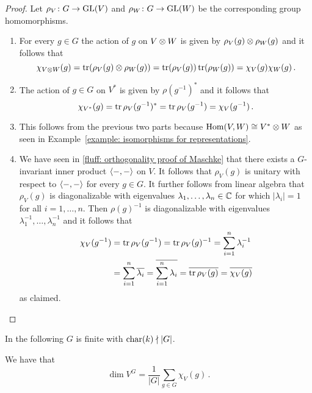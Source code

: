 \begin{proof}
  Let $\rho_V \colon G \to \operatorname{GL}(V)$ and $\rho_W \colon G \to \operatorname{GL}(W)$ be the corresponding group homomorphisms.
  \begin{enumerate}
    \item
      For every $g \in G$ the action of $g$ on $V \mathbin{\otimes} W$ is given by $\rho_V(g) \mathbin{\otimes} \rho_W(g)$ and it follows that
      \[
          \chi_{V \mathbin{\otimes} W}(g)
        = \operatorname{tr}( \rho_V(g) \mathbin{\otimes} \rho_W(g) )
        = \operatorname{tr}( \rho_V(g) ) \operatorname{tr}( \rho_W(g) )
        = \chi_V(g) \chi_W(g) \,.
      \]
    \item
      The action of $g \in G$ on $V^*$ is given by $\rho(g^{-1})^*$ and it follows that
      \[
          \chi_{V^*}(g)
        = \operatorname{tr} \rho_V(g^{-1})^*
        = \operatorname{tr} \rho_V(g^{-1})
        = \chi_V(g^{-1}) \,.
      \]
    \item
      This follows from the previous two parts because $\operatorname{Hom}(V,W) \cong V^* \otimes W$ as seen in Example~\ref{example: isomorphisms for representations}.
    \item
      We have seen in \ref*{fluff: orthogonality proof of Maschke} that there exists a $G$-invariant inner product $\langle -,- \rangle$ on $V$.
      It follows that $\rho_V(g)$ is unitary with respect to $\langle -,- \rangle$ for every $g \in G$.
      It further follows from linear algebra that $\rho_V(g)$ is diagonalizable with eigenvalues $\lambda_1, \dotsc, \lambda_n \in \mathbb{C}$ for which $|\lambda_i| = 1$ for all $i = 1, \dotsc, n$.
      Then $\rho(g)^{-1}$ is diagonalizable with eigenvalues $\lambda_1^{-1}, \dotsc, \lambda_n^{-1}$ and it follows that
      \begin{align*}
          \chi_V(g^{-1})
        &= \operatorname{tr} \rho_V(g^{-1})
         = \operatorname{tr} \rho_V(g)^{-1}
         = \sum_{i=1}^n \lambda_i^{-1}  \\
        &= \sum_{i=1}^n \overline{\lambda_i}
         = \overline{ \sum_{i=1}^n \lambda_i }
         = \overline{ \operatorname{tr} \rho_V(g) }
         = \overline{ \chi_V(g) }
      \end{align*}
      as claimed.
    \qedhere
  \end{enumerate}
\end{proof}


\begin{conventions}
  In the following $G$ is finite with $\operatorname{char}(k) \nmid |G|$.
\end{conventions}


\begin{lemma}
  \label{lemma: dimension of invariants via character}
  We have that
  \[
      \dim V^G
    = \frac{1}{|G|} \sum_{g \in G} \chi_V(g) \,.
  \]
\end{lemma}


